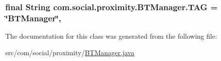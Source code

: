\hypertarget{classcom_1_1social_1_1proximity_1_1_b_t_manager_a0e30700e3885560c22465cb8bd1542a2}{}
\subsubsection[{T\+A\+G}]{\setlength{\rightskip}{0pt plus 5cm}final String com.\+social.\+proximity.\+B\+T\+Manager.\+T\+A\+G = \char`\"{}B\+T\+Manager\char`\"{}\hspace{0.3cm}{\ttfamily [static]}, {\ttfamily [private]}}\label{classcom_1_1social_1_1proximity_1_1_b_t_manager_a0e30700e3885560c22465cb8bd1542a2}


The documentation for this class was generated from the following file\+:\begin{DoxyCompactItemize}
\item 
src/com/social/proximity/\hyperlink{_b_t_manager_8java}{B\+T\+Manager.\+java}\end{DoxyCompactItemize}
